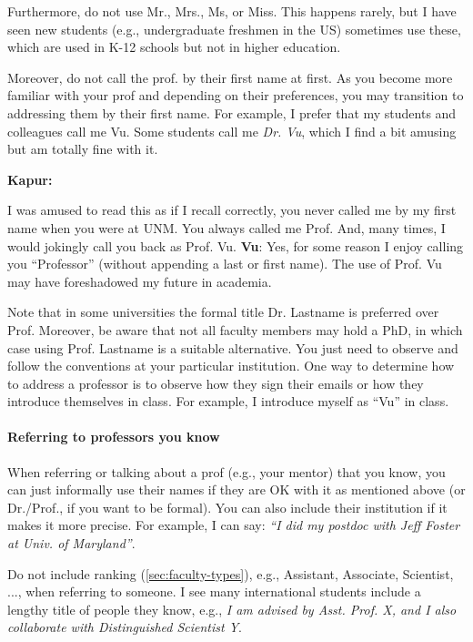 \documentclass[oneside,11pt,dvipsnames]{book}
\newenvironment{commentbox}[1][]{
  \small
  \begin{mybox}
    {\small \textbf{#1}}
  }{
  \end{mybox}
}
\begin{document}
Furthermore, do not use Mr., Mrs., Ms, or Miss. This happens rarely, but I have seen  new students (e.g., undergraduate freshmen in the US) sometimes use these, which are used in K-12 schools but not in higher education.

Moreover, do not call the prof. by their first name at first.  As you become more familiar with your prof and depending on their preferences, you may transition to addressing them by their first name.
For example, I prefer that my students and colleagues call me Vu. Some students call me \emph{Dr. Vu}, which I find a bit amusing but am totally fine with it.

\begin{commentbox}[Kapur:]
  I was amused to read this as if I recall correctly, you never called me by my first name when you were at UNM. You always called me Prof. And, many times, I would jokingly call you back as Prof. Vu.
  \tcblower
  \textbf{Vu}: Yes, for some reason I enjoy calling you ``Professor'' (without appending a last or first name).  The use of Prof. Vu may have foreshadowed my future in academia.
\end{commentbox}

Note that in some universities the formal title Dr. Lastname is preferred over Prof. Moreover, be aware that not all faculty members may hold a PhD, in which case using Prof. Lastname is a suitable alternative. 	You just need to observe and follow the conventions at your particular institution. One way to determine how to address a professor is to observe how they sign their emails or how they introduce themselves in class. For example, I introduce myself as ``Vu'' in class.



\paragraph{Referring to professors you know} When referring or talking about a prof (e.g., your mentor) that you know, you can just informally use their names if they are OK with it as mentioned above (or Dr./Prof., if you want to be formal). You can also include their institution if it makes it more precise.  For example, I can say:  \emph{``I did my postdoc with Jeff Foster at Univ. of Maryland''}.

Do not include ranking (\autoref{sec:faculty-types}), e.g., Assistant, Associate, Scientist, ..., when referring to someone. I see many international students include a lengthy title of people they know, e.g., \emph{I am advised by Asst. Prof. X, and I also collaborate with Distinguished Scientist Y}.  
\end{document}
